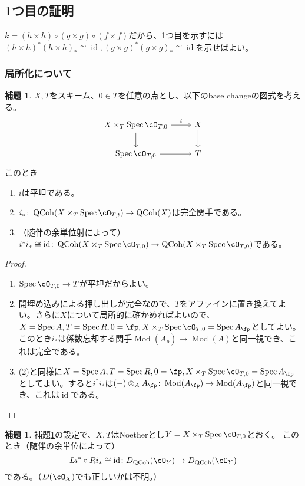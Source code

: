 \documentclass[uplatex, a4paper, dvipdfmx]{jsarticle}
\theoremstyle{definition}
\newtheorem{lemma}[theorem]{補題}
\DeclareMathOperator{\id}{\mathrm{id}}
\DeclareMathOperator{\Spec}{\mathrm{Spec}}
\DeclareMathOperator{\QCoh}{\mathrm{QCoh}}
\DeclareMathOperator{\Mod}{\mathrm{Mod}}
\begin{document}
\subsection{1つ目の証明}
$k = (h \times h) \circ (g \times g) \circ (f \times f)$だから、1つ目を示すには$(h \times h)^*(h \times h)_* \cong \id, (g \times g)^*(g \times g)_* \cong \id$を示せばよい。
\subsubsection{局所化について}
\begin{lemma}\label{lem:base-change-by-localizaion}
    $X, T$をスキーム、$0 \in T$を任意の点とし、以下のbase changeの図式を考える。
    \[
        \begin{tikzcd}
            X \times_T \Spec \cO_{T, 0} \ar[r, "i"] \ar[d]& X \ar[d]\\
            \Spec \cO_{T, 0} \ar[r]& T
        \end{tikzcd}
    \]
    このとき
    \begin{enumerate}
        \item $i$は平坦である。
        \item $i_* \colon \QCoh(X \times_T \Spec \cO_{T, t}) \to \QCoh(X)$は完全関手である。
        \item （随伴の余単位射によって）$i^*i_* \cong \id \colon \QCoh( X \times_T \Spec \cO_{T, 0}) \to \QCoh( X \times_T \Spec \cO_{T, 0})$である。
    \end{enumerate}
\end{lemma}
\begin{proof}
    \begin{enumerate}
        \item $\Spec \cO_{T, 0} \to T$が平坦だからよい。
        \item 開埋め込みによる押し出しが完全なので、$T$をアファインに置き換えてよい。さらに$X$について局所的に確かめればよいので、$X = \Spec A, T = \Spec R, 0 = \fp, X \times_T \Spec \cO_{T, 0} = \Spec A_{\fp}$としてよい。このとき$i_*$は係数忘却する関手$\Mod(A_p) \to \Mod(A)$と同一視でき、これは完全である。
        \item (2)と同様に$X = \Spec A, T = \Spec R, 0 = \fp, X \times_T \Spec \cO_{T, 0} = \Spec A_{\fp}$としてよい。すると$i^*i_*$は$(-)\otimes_A A_{\fp} \colon \Mod(A_{\fp}) \to \Mod(A_{\fp})$と同一視でき、これは$\id$である。
    \end{enumerate}
\end{proof}
\begin{lemma}
    補題\ref{lem:base-change-by-localizaion}の設定で、$X, T$はNoetherとし$Y =  X \times_T \Spec \cO_{T, 0}$とおく。
    このとき（随伴の余単位によって）
    \begin{equation}
        Li^* \circ Ri_* \cong \id \colon D_{\QCoh}(\cO_Y) \to D_{\QCoh}(\cO_Y)
    \end{equation}
    である。（$D(\cO_X)$でも正しいかは不明。）
\end{lemma}
\end{document}
